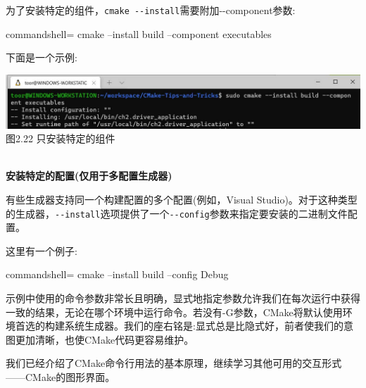 为了安装特定的组件，\texttt{cmake -{}-install}需要附加-{}-component参数:

\begin{tcblisting}{commandshell={}}
cmake --install build --component executables
\end{tcblisting}

下面是一个示例:

\begin{center}
\includegraphics[width=1.\textwidth]{content/1/chapter2/images/22.jpg}\\
图2.22 只安装特定的组件
\end{center}

\hspace*{\fill} \\ %
\noindent
\textbf{安装特定的配置(仅用于多配置生成器)}

有些生成器支持同一个构建配置的多个配置(例如，Visual Studio)。对于这种类型的生成器，\texttt{-{}-install}选项提供了一个\texttt{-{}-config}参数来指定要安装的二进制文件配置。

这里有一个例子:

\begin{tcblisting}{commandshell={}}
cmake --install build --config Debug
\end{tcblisting}

\begin{tcolorbox}[colback=webgreen!5!white,colframe=webgreen!75!black,title=Note]
示例中使用的命令参数非常长且明确，显式地指定参数允许我们在每次运行中获得一致的结果，无论在哪个环境中运行命令。若没有-G参数，CMake将默认使用环境首选的构建系统生成器。我们的座右铭是:显式总是比隐式好，前者使我们的意图更加清晰，也使CMake代码更容易维护。
\end{tcolorbox}

我们已经介绍了CMake命令行用法的基本原理，继续学习其他可用的交互形式——CMake的图形界面。












